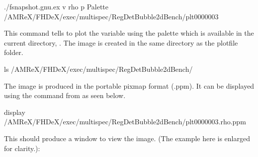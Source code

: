\documentclass[letterpaper,10pt,english]{sphinxmanual}
\begin{document}
\begin{sphinxVerbatim}[commandchars=\\\{\}]
./fsnapshot.gnu.ex 
\PYGZhy{}v rho \PYGZhy{}p Palette \PYGZti{}/AMReX/FHDeX/exec/multispec/Reg\PYGZus{}DetBubble\PYGZus{}2d\PYGZus{}Bench/plt0000003
\end{sphinxVerbatim}

\sphinxAtStartPar
This command tells  to plot the variable  using the palette
 which is available in the current directory, .
The image is created in the same directory as the plotfile folder.

\begin{sphinxVerbatim}[commandchars=\\\{\}]
ls \PYGZti{}/AMReX/FHDeX/exec/multispec/Reg\PYGZus{}DetBubble\PYGZus{}2d\PYGZus{}Bench/
\end{sphinxVerbatim}

\sphinxAtStartPar
The image is produced in the portable pixmap format (.ppm). It can be displayed using
the command  from  as seen below.

\begin{sphinxVerbatim}[commandchars=\\\{\}]
display 
\PYGZti{}/AMReX/FHDeX/exec/multispec/Reg\PYGZus{}DetBubble\PYGZus{}2d\PYGZus{}Bench/plt0000003.rho.ppm
\end{sphinxVerbatim}

\sphinxAtStartPar
This should produce a window to view the image. (The example here is enlarged for clarity.):

\noindent{}

\begin{DUlineblock}{0em}
\item[] 
\end{DUlineblock}
\end{document}
